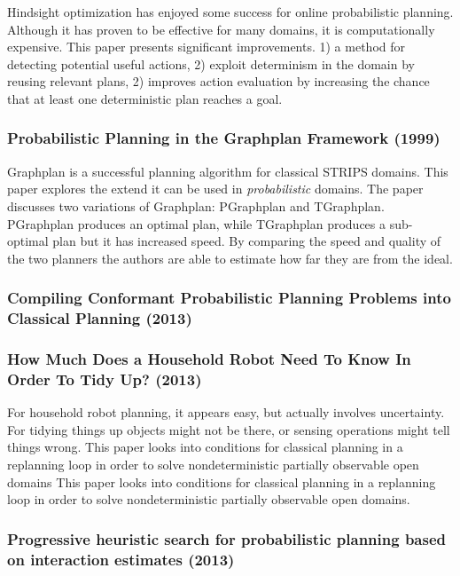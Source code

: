 \documentclass[runningheads,a4paper]{llncs}
\begin{document}
Hindsight optimization has enjoyed some success for online probabilistic
planning. Although it has proven to be effective for many domains, it is
computationally expensive. This paper presents significant improvements.  1) a
method for detecting potential useful actions, 2) exploit determinism in the
domain by reusing relevant plans, 2) improves action evaluation by increasing
the chance that at least one deterministic plan reaches a goal.

\subsubsection{Probabilistic Planning in the Graphplan Framework (1999)~\cite{Blum99probabilisticplanning}}

Graphplan is a successful planning algorithm for classical STRIPS domains. This
paper explores the extend it can be used in \emph{probabilistic} domains. The
paper discusses two variations of Graphplan: PGraphplan and TGraphplan.
PGraphplan produces an optimal plan, while TGraphplan produces a sub-optimal
plan but it has increased speed. By comparing the speed and quality of the
two planners the authors are able to estimate how far they are from the ideal.

\subsubsection{Compiling Conformant Probabilistic Planning Problems into Classical Planning (2013)~\cite{taig2013conformant}}

\subsubsection{How Much Does a Household Robot Need To Know In Order To Tidy Up? (2013)~\cite{nebel2013much}}

For household robot planning, it appears easy, but actually involves
uncertainty. For tidying things up objects might not be there, or sensing
operations might tell things wrong. This paper looks into conditions for
classical planning in a replanning loop in order to solve nondeterministic
partially observable open domains This paper looks into conditions for
classical planning in a replanning loop in order to solve nondeterministic
partially observable open domains.

\subsubsection{Progressive heuristic search for probabilistic planning based on interaction estimates (2013)~\cite{martin2013progressive}}
\end{document}
